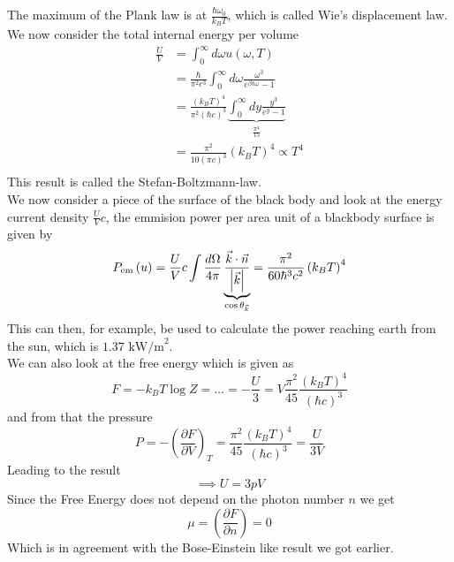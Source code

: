 \documentclass{report}
\begin{document}
The maximum of the Plank law is at $\frac{\hbar \omega_0}{k_B T}$, which is called Wie's displacement law.\\
We now consider the total internal energy per volume 
\begin{align*}
  \frac{U}{V} &= \int_0^{\infty} d\omega u\left( \omega, T \right) \\
  &= \frac{\hbar}{\pi^2 c ^3} \int_0^{\infty} d\omega \frac{\omega^3}{e^{\beta \hbar \omega} - 1} \\
  &= \frac{\left( k_B T \right) ^{4}}{\pi^2 \left( \hbar c \right) ^3} \underbrace{\int_0^{\infty} dy \frac{y^3}{e^{y}- 1}}_{\frac{\pi^{4}}{15}} \\
  &= \frac{\pi^2}{10\left( \pi c \right) ^3} \left( k_B T \right) ^{4} \propto T^{4} \\
\end{align*}
This result is called the Stefan-Boltzmann-law.\\
We now consider a piece of the surface of the black body and look at the energy current density $\frac{U}{V} c$, the emmision power per area unit of a blackbody surface is given by \[
  P_{\text{em}}\left( u \right) = \frac{U}{V}c \int \frac{d\Omega}{4 \pi} \underbrace{\frac{\vec{k} \cdot \vec{n}}{\abs{\vec{k}}}}_{\cos \theta_{\vec{k}}} =
  \frac{\pi^2}{60 \hbar^3 c^2} \left( k_B T \right)^{4} 
\] 
This can then, for example, be used to calculate the power reaching earth from the sun, which is $1.37$ $\text{kW/m}^2$. \\
We can also look at the free energy which is given as \[
  F = -k_B T \log Z = \ldots = - \frac{U}{3} = V \frac{\pi^2}{45} \frac{\left( k_B T \right) ^{4}}{\left( \hbar c \right) ^3}
\] and from that the pressure \[
P = -\left( \frac{\partial F}{\partial V} \right)_T = \frac{\pi^2}{45} \frac{\left( k_B T \right) ^{4}}{\left( \hbar c \right) ^3} = \frac{U}{3V}
\] Leading to the result \[
\implies U = 3pV
\] 
Since the Free Energy does not depend on the photon number $n$ we get \[
  \mu = \left( \frac{\partial F}{\partial n} \right) = 0
\] 
Which is in agreement with the Bose-Einstein like result we got earlier.
\end{document}
